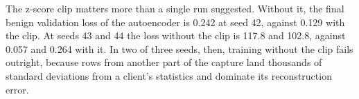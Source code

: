 The z-score clip matters more than a single run suggested. Without it, the final benign validation loss of the autoencoder is 0.242 at seed 42, against 0.129 with the clip. At seeds 43 and 44 the loss without the clip is 117.8 and 102.8, against 0.057 and 0.264 with it. In two of three seeds, then, training without the clip fails outright, because rows from another part of the capture land thousands of standard deviations from a client's statistics and dominate its reconstruction error.
